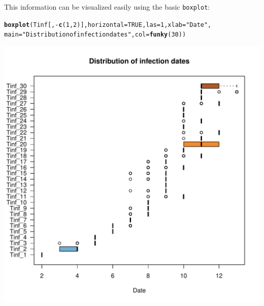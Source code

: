 \documentclass{article}\usepackage[]{graphicx}\usepackage[]{color}
\makeatletter
\newcommand{\hlnum}[1]{\textcolor[rgb]{0.686,0.059,0.569}{#1}}%
\newcommand{\hlstr}[1]{\textcolor[rgb]{0.192,0.494,0.8}{#1}}%
\newcommand{\hlopt}[1]{\textcolor[rgb]{0,0,0}{#1}}%
\newcommand{\hlstd}[1]{\textcolor[rgb]{0.345,0.345,0.345}{#1}}%
\newcommand{\hlkwc}[1]{\textcolor[rgb]{0.333,0.667,0.333}{#1}}%
\newcommand{\hlkwd}[1]{\textcolor[rgb]{0.737,0.353,0.396}{\textbf{#1}}}%
\newenvironment{kframe}{%
 \def\at@end@of@kframe{}%
 \ifinner\ifhmode%
  \def\at@end@of@kframe{\end{minipage}}%
  \begin{minipage}{\columnwidth}%
 \fi\fi%
 \def\FrameCommand##1{\hskip\@totalleftmargin \hskip-\fboxsep
 \colorbox{shadecolor}{##1}\hskip-\fboxsep
     \hskip-\linewidth \hskip-\@totalleftmargin \hskip\columnwidth}%
 \MakeFramed {\advance\hsize-\width
   \@totalleftmargin\z@ \linewidth\hsize
   \@setminipage}}%
 {\par\unskip\endMakeFramed%
 \at@end@of@kframe}
\newenvironment{knitrout}{}{} %
\makeatother
\begin{document}
This information can be visualized easily using the basic \texttt{boxplot}:
\begin{knitrout}
\color{fgcolor}\begin{kframe}
\begin{alltt}
\hlkwd{boxplot}\hlstd{(Tinf[,}\hlopt{-}\hlkwd{c}\hlstd{(}\hlnum{1}\hlstd{,}\hlnum{2}\hlstd{)],} \hlkwc{horizontal}\hlstd{=}\hlnum{TRUE}\hlstd{,} \hlkwc{las}\hlstd{=}\hlnum{1}\hlstd{,} \hlkwc{xlab}\hlstd{=}\hlstr{"Date"}\hlstd{,}
        \hlkwc{main}\hlstd{=}\hlstr{"Distribution of infection dates"}\hlstd{,} \hlkwc{col}\hlstd{=}\hlkwd{funky}\hlstd{(}\hlnum{30}\hlstd{))}
\end{alltt}
\end{kframe}

{\centering \includegraphics[width=.6\textwidth]{figs/unnamed-chunk-30} 

}



\end{knitrout}
\end{document}
